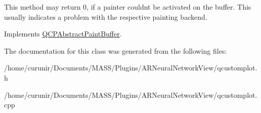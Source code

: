 This method may return 0, if a painter couldn\textquotesingle{}t be activated on the buffer. This usually indicates a problem with the respective painting backend. 

Implements \hyperlink{class_q_c_p_abstract_paint_buffer_a9e9f29b19c033cf02fb96f1a148463f3}{Q\+C\+P\+Abstract\+Paint\+Buffer}.



The documentation for this class was generated from the following files\+:\begin{DoxyCompactItemize}
\item 
/home/curunir/\+Documents/\+M\+A\+S\+S/\+Plugins/\+A\+R\+Neural\+Network\+View/qcustomplot.\+h\item 
/home/curunir/\+Documents/\+M\+A\+S\+S/\+Plugins/\+A\+R\+Neural\+Network\+View/qcustomplot.\+cpp\end{DoxyCompactItemize}
